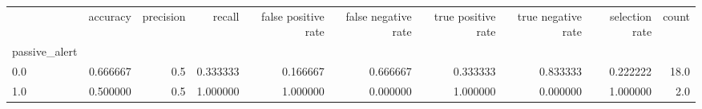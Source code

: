 \begin{tabular}{lrrrrrrrrr}
\toprule
{} &  accuracy &  precision &    recall &  false positive rate &  false negative rate &  true positive rate &  true negative rate &  selection rate &  count \\
passive\_alert &           &            &           &                      &                      &                     &                     &                 &        \\
\midrule
0.0           &  0.666667 &        0.5 &  0.333333 &             0.166667 &             0.666667 &            0.333333 &            0.833333 &        0.222222 &   18.0 \\
1.0           &  0.500000 &        0.5 &  1.000000 &             1.000000 &             0.000000 &            1.000000 &            0.000000 &        1.000000 &    2.0 \\
\bottomrule
\end{tabular}
